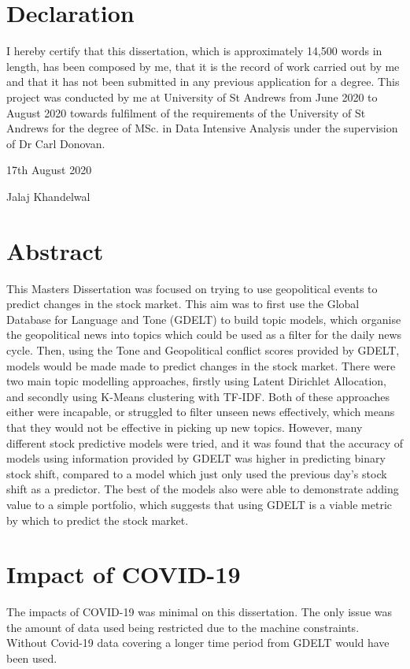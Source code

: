 \documentclass[a4paper]{article}
\begin{document}
\section*{Declaration}
I hereby certify that this dissertation, which is approximately 14,500 words in length, has been composed by me, that it is the record of work carried out by me and that it has not been submitted in any previous application for a degree. This project was conducted by me at University of St Andrews from June 2020 to August 2020 towards fulfilment of the requirements of the University of St Andrews for the degree of MSc. in Data Intensive Analysis under the supervision of Dr Carl Donovan.

17th August 2020

Jalaj Khandelwal
\section*{Abstract}
This Masters Dissertation was focused on trying to use geopolitical events to predict changes in the stock market. This aim was to first use the Global Database for Language and Tone (GDELT) to build topic models, which organise the geopolitical news into topics which could be used as a filter for the daily news cycle. Then, using the Tone and Geopolitical conflict scores provided by GDELT, models would be made made to predict changes in the stock market. There were two main topic modelling approaches, firstly using Latent Dirichlet Allocation, and secondly using K-Means clustering with TF-IDF. Both of these approaches either were incapable, or struggled to filter unseen news effectively, which means that they would not be effective in picking up new topics. However, many different stock predictive models were tried, and it was found that the accuracy of models using information provided by GDELT was higher in predicting binary stock shift, compared to a model which just only used the previous day's stock shift as a predictor. The best of the models also were able to demonstrate adding value to a simple portfolio, which suggests that using GDELT is a viable metric by which to predict the stock market. 
\section*{Impact of COVID-19}
The impacts of COVID-19 was minimal on this dissertation. The only issue was the amount of data used being restricted due to the machine constraints. Without Covid-19 data covering a longer time period from GDELT would have been used.
\newpage
\tableofcontents
\listoftables
\newpage
\listoffigures














\end{document}
